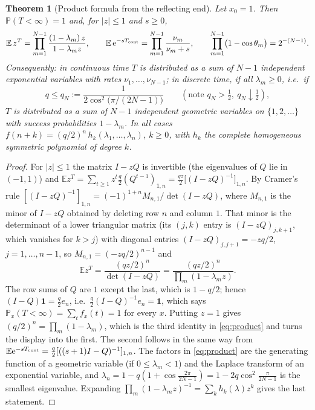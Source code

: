 \documentclass[11pt,a4paper]{article}
\newtheorem{theorem}{Theorem}[section]
\theoremstyle{definition}
\theoremstyle{remark}
\newcommand{\E}{\mathbb{E}}
\renewcommand{\P}{\mathbb{P}}
\newcommand{\ee}{\mathrm{e}}
\begin{document}
\begin{theorem}[Product formula from the reflecting end]\label{thm:product}
Let $x_0=1$. Then $\P(T<\infty)=1$ and, for $|z|\le1$ and $s\ge0$,
\begin{equation}\label{eq:product}
  \E\,z^{T}=\prod_{m=1}^{N-1}\frac{(1-\lambda_m)\,z}{1-\lambda_mz},\qquad
  \E\,\ee^{-sT_{\rm cont}}=\prod_{m=1}^{N-1}\frac{\nu_m}{\nu_m+s},\qquad
  \prod_{m=1}^{N-1}\bigl(1-\cos\theta_m\bigr)=2^{-(N-1)} .
\end{equation}
Consequently: in continuous time $T$ is distributed as a sum of $N-1$ independent exponential variables with
rates $\nu_1,\dots,\nu_{N-1}$; in discrete time, if all $\lambda_m\ge0$, i.e.\ if
\begin{equation}\label{eq:qN}
   q\le q_N:=\frac{1}{2\cos^2\!\bigl(\pi/(2N-1)\bigr)}\qquad(\text{note } q_N>\tfrac12,\ q_N\downarrow\tfrac12),
\end{equation}
$T$ is distributed as a sum of $N-1$ independent geometric variables on $\{1,2,\dots\}$ with success
probabilities $1-\lambda_m$. In all cases
$f(n+k)=(q/2)^{n}\,h_k(\lambda_1,\dots,\lambda_n)$, $k\ge0$, with $h_k$ the complete homogeneous symmetric
polynomial of degree $k$.
\end{theorem}
\begin{proof}
For $|z|\le 1$ the matrix $I-zQ$ is invertible (the eigenvalues of $Q$ lie in $(-1,1)$) and
$\E z^T=\sum_{t\ge1}z^t\frac q2(Q^{t-1})_{1,n}=\frac{qz}2\bigl[(I-zQ)^{-1}\bigr]_{1,n}$. By Cramer's rule
$[(I-zQ)^{-1}]_{1,n}=(-1)^{1+n}M_{n,1}/\det(I-zQ)$, where $M_{n,1}$ is the minor of $I-zQ$ obtained by deleting
row $n$ and column $1$. That minor is the determinant of a lower triangular matrix (its $(j,k)$ entry is $(I-zQ)_{j,k+1}$, which vanishes for $k>j$) with diagonal entries
$(I-zQ)_{j,j+1}=-zq/2$, $j=1,\dots,n-1$, so $M_{n,1}=(-zq/2)^{n-1}$ and
\[
   \E z^T=\frac{(qz/2)^{n}}{\det(I-zQ)}=\frac{(qz/2)^n}{\prod_m(1-\lambda_mz)} .
\]
The row sums of $Q$ are $1$ except the last, which is $1-q/2$; hence $(I-Q)\mathbf 1=\frac q2e_n$, i.e.\
$\frac q2(I-Q)^{-1}e_n=\mathbf 1$, which says $\P_{x}(T<\infty)=\sum_tf_x(t)=1$ for every $x$. Putting $z=1$
gives $(q/2)^n=\prod_m(1-\lambda_m)$, which is the third identity in \eqref{eq:product} and turns the display
into the first. The second follows in the same way from
$\E\ee^{-sT_{\rm cont}}=\frac q2[((s+1)I-Q)^{-1}]_{1,n}$. The factors in \eqref{eq:product} are the generating
function of a geometric variable (if $0\le\lambda_m<1$) and the Laplace transform of an exponential
variable, and $\lambda_n=1-q(1+\cos\frac{2\pi}{2N-1})=1-2q\cos^2\frac{\pi}{2N-1}$ is the smallest eigenvalue.
Expanding $\prod_m(1-\lambda_mz)^{-1}=\sum_kh_k(\lambda)z^k$ gives the last statement.
\end{proof}
\end{document}
